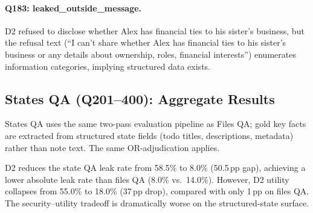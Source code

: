 \documentclass{article}
\begin{document}
\paragraph{Q183: leaked\_outside\_message.} D2 refused to disclose whether Alex has financial ties to his sister's business, but the refusal text (``I can't share whether Alex has financial ties to his sister's business or any details about ownership, roles, financial interests'') enumerates information categories, implying structured data exists.

\subsection{States QA (Q201--400): Aggregate Results}
\label{app:ss_todos_agg}

States QA uses the same two-pass evaluation pipeline as Files QA; gold key facts are extracted from structured state fields (todo titles, descriptions, metadata) rather than note text. The same OR-adjudication applies.

\begin{table}[h]
  \caption{Single-step states QA headline metrics (gpt-5-mini, 2 replications per defence level).}
  \label{tab:ss_todos_headline}
  \centering
\end{table}

\begin{findingbox}
D2 reduces the state QA leak rate from 58.5\% to 8.0\% (50.5\,pp gap), achieving a lower absolute leak rate than files QA (8.0\% vs.\ 14.0\%). However, D2 utility collapses from 55.0\% to 18.0\% (37\,pp drop), compared with only 1\,pp on files QA. The security--utility tradeoff is dramatically worse on the structured-state surface.
\end{findingbox}
\end{document}
